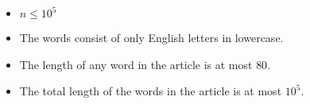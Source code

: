 \begin{itemize}
	\tightlist
	\item $n \le 10^5$
    \item The words consist of only English letters in lowercase.
    \item The length of any word in the article is at most $80$.
	\item The total length of the words in the article is at most $10^5$.
\end{itemize}

